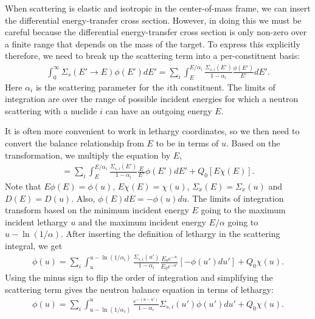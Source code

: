 When scattering is elastic and isotropic in the center-of-mass frame, we can insert the differential energy-transfer cross section. However, in doing this we must be careful because the differential energy-transfer cross section is only non-zero over a finite range that depends on the mass of the target. To express this explicitly therefore, we need to break up the scattering term into a per-constituent basis:
\begin{align}
  \int_0^\infty \Sigma_s(E' \rightarrow E) \phi(E') dE' = \sum_i \int_E^{E/\alpha_i} \frac{\Sigma_{s,i}(E')}{1 - \alpha_i} \frac{\phi(E')}{E'} dE' .
\end{align}
Here $\alpha_i$ is the scattering parameter for the $i$th constituent. The limits of integration are over the range of possible incident energies for which a neutron scattering with a nuclide $i$ can have an outgoing energy $E$.

It is often more convenient to work in lethargy coordinates, so we then need to convert the balance relationship from $E$ to be in terms of $u$. Based on the transformation, we multiply the equation by $E$,
\begin{align}
  [ B^2 D(E) + \Sigma_t(E) ] [ E \phi(E) ] = \sum_i \int_E^{E/\alpha_i} \frac{\Sigma_{s,i}(E')}{1 - \alpha_i} \frac{E}{E'} \phi(E') dE' + Q_0 [ E \chi(E) ]. \nonumber
\end{align}
Note that $E \phi(E) = \phi(u)$, $E\chi(E) = \chi(u)$, $\Sigma_x(E) = \Sigma_x(u)$ and $D(E) = D(u)$. Also, $\phi(E) dE = -\phi(u) du$. The limits of integration transform based on the minimum incident energy $E$ going to the maximum incident lethargy $u$ and the maximum incident energy $E/\alpha$ going to $u - \ln(1/\alpha)$. After inserting the definition of lethargy in the scattering integral, we get
\begin{align}
  [ B^2 D(u) + \Sigma_t(u) ] \phi(u) = \sum_i \int_u^{u-\ln(1/\alpha_i)} \frac{\Sigma_{s,i}(u')}{1 - \alpha_i} \frac{E_0 e^{-u}}{E_0e^{-u'}} \left[ - \phi(u') du' \right] + Q_0 \chi(u) . \nonumber
\end{align}
Using the minus sign to flip the order of integration and simplifying the scattering term gives the neutron balance equation in terms of lethargy:
\begin{align}
  [ B^2 D(u) + \Sigma_t(u) ] \phi(u) = \sum_i \int_{u-\ln(1/\alpha_i)}^u \frac{e^{-(u-u')}}{1 - \alpha_i} \Sigma_{s,i}(u') \phi(u') du' + Q_0 \chi(u) . \label{Eq:thermalization_neutronBalance_MixtureLethargy}
\end{align}

